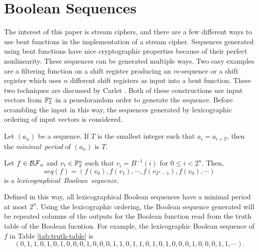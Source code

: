 \section{Boolean Sequences}\label{sec:boolean-sequences}
\par The interest of this paper is stream ciphers, and there are a few
different ways to use bent functions in the implementation of a stream
cipher. Sequences generated using bent functions have nice cryptographic
properties because of their perfect nonlinearity. These sequences can be
generated multiple ways. Two easy examples are a filtering function on a
shift register producing an $m$-sequence or a shift register which uses $n$
different shift registers as input into a bent function. These two
techniques are discussed by Carlet \cite{col:c06}. Both of these
constructions use input vectors from $\mathbb{F}_2^n$ in a psuedorandom order to
generate the sequence. Before scrambling the input in this way, the
sequences generated by lexicographic ordering of input vectors is
considered.

\begin{definition}
  Let $(a_n)$ be a sequence. If $T$ is the smallest integer such that
  $a_i=a_{i+T}$, then the {\em minimal\ period} of $(a_n)$ is $T$.
\end{definition}

\begin{definition}\label{def:lex-Bool-seq}
  Let $f\in\mathcal{BF}_n$ and $v_i\in\mathbb{F}_2^n$ such that $v_i=B^{-1}(i)$ for
  $0\leq i<2^n$. Then,
  \begin{equation}
    seq(f)=(f(v_0),f(v_1),\cdots,f(v_{2^n-1}),f(v_0),\cdots)
  \end{equation}
  is a {\em lexicographical\ Boolean\ sequence}.
\end{definition}

\par Defined in this way, all lexicographical Boolean sequences have a
minimal period at most $2^n$. Using the lexicographic ordering, the Boolean
sequence generated will be repeated columns of the outputs for the Boolean
function read from the truth table of the Boolean fucntion. For example, the
lexicographic Boolean sequence of $f$ in Table \ref{tab:truth-table} is
\[
(0,1,1,0,1,0,1,0,0,0,1,0,0,0,1,1,0,1,1,0,1,0,1,0,0,0,1,0,0,0,1,1,\cdots).
\]

